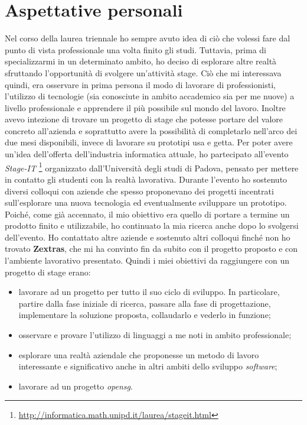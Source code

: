 \section{Aspettative personali}\label{sec:aspettative_personali}
Nel corso della laurea triennale ho sempre avuto idea di ciò che volessi fare dal punto di vista professionale una volta finito gli studi. Tuttavia, prima di specializzarmi in un determinato ambito, ho deciso di esplorare altre realtà sfruttando l'opportunità di svolgere un'attività stage. Ciò che mi interessava quindi, era osservare in prima persona il modo di lavorare di professionisti, l'utilizzo di tecnologie (sia conosciute in ambito accademico sia per me nuove) a livello professionale e apprendere il più possibile sul mondo del lavoro. Inoltre avevo intezione di trovare un progetto di stage che potesse portare del valore concreto all'azienda e soprattutto avere la possibilità di completarlo nell'arco dei due mesi disponibili, invece di lavorare su prototipi usa e getta.
Per poter avere un'idea dell'offerta dell'industria informatica attuale, ho partecipato all'evento \textit{Stage-IT} \footnote{\url{http://informatica.math.unipd.it/laurea/stageit.html}} organizzato dall'Università degli studi di Padova, pensato per mettere in contatto gli studenti con la realtà lavorativa. Durante l'evento ho sostenuto diversi colloqui con aziende che spesso proponevano dei progetti incentrati sull'esplorare una nuova tecnologia ed eventualmente sviluppare un prototipo. Poiché, come già accennato, il mio obiettivo era quello di portare a termine un prodotto finito e utilizzabile, ho continuato la mia ricerca anche dopo lo svolgersi dell'evento. Ho contattato altre aziende e sostenuto altri colloqui finché non ho trovato \textbf{Zextras}, che mi ha convinto fin da subito con il progetto proposto e con l'ambiente lavorativo presentato. Quindi i miei obiettivi da raggiungere con un progetto di stage erano:
\begin{itemize}
    \item lavorare ad un progetto per tutto il suo ciclo di sviluppo. In particolare, partire dalla fase iniziale di ricerca, passare alla fase di progettazione, implementare la soluzione proposta, collaudarlo e vederlo in funzione;
    \item osservare e provare l'utilizzo di linguaggi a me noti in ambito professionale;
    \item esplorare una realtà aziendale che proponesse un metodo di lavoro interessante e significativo anche in altri ambiti dello sviluppo \textit{software};
    \item lavorare ad un progetto \textit{\gls{opensg}}.
\end{itemize}